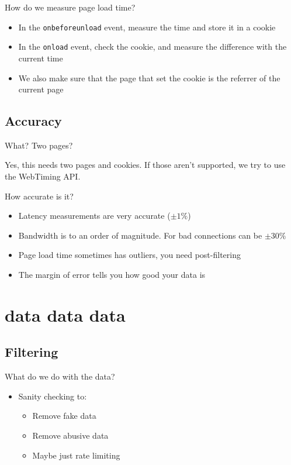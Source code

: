 \documentclass{beamer}
\begin{document}
\begin{frame}{How do we measure page load time?}
  \begin{itemize}
  \item In the \texttt{onbeforeunload} event, measure the time and store it in a cookie
  \item In the \texttt{onload} event, check the cookie, and measure the difference with the current time
  \item We also make sure that the page that set the cookie is the referrer of the current page
  \end{itemize}
\end{frame}

\subsection{Accuracy}

\begin{frame}{What? Two pages?}
  \begin{center}
  Yes, this needs two pages and cookies.  If those aren't supported, we try to use the WebTiming API.
  \end{center}
\end{frame}

\begin{frame}{How accurate is it?}
  \begin{itemize}
  \item Latency measurements are very accurate (\(\pm 1\%\))
  \item Bandwidth is to an order of magnitude. For bad connections can be \(\pm 30\%\)
  \item Page load time sometimes has outliers, you need post-filtering
  \item The margin of error tells you how good your data is
  \end{itemize}
\end{frame}

\section{data data data}

\subsection{Filtering}

\begin{frame}{What do we do with the data?}
  \begin{itemize}
  \item Sanity checking to:
    \begin{itemize}
    \item Remove fake data
    \item Remove abusive data
    \item Maybe just rate limiting
    \end{itemize}
  \end{itemize}
\end{frame}
\end{document}
